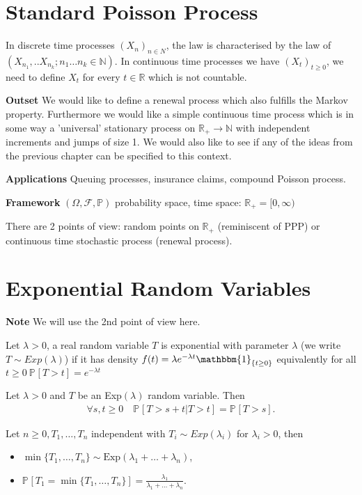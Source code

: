 \section{Standard Poisson Process}
In discrete time processes $(X_n)_{n\in N}$, the law is characterised by the law of $(X_{n_1},..X_{n_k}; n_1 \ldots n_k \in \mathbb{N})$. In continuous time processes we have $(X_t)_{t\geq 0}$, we need to define $X_t$ for every $ t \in \mathbb{R}$ which is not countable.

\noindent \textbf{Outset} We would like to define a renewal process which also fulfills the Markov property. Furthermore we would like a simple continuous time process which is in some way a 'universal' stationary process on $\mathbb{R}_+ \to \mathbb{N}$ with independent increments and jumps of size 1. We would also like to see if any of the ideas from the previous chapter can be specified to this context.

\textbf{Applications} Queuing processes, insurance claims, compound Poisson process.

\textbf{Framework} $(\Omega, \mathcal{F}, \mathbb{P})$ probability space, time space: $\mathbb{R}_{+}=[0,\infty)$ 

There are 2 points of view: random points on $\mathbb{R}_{+}$ (reminiscent of PPP) or continuous time stochastic process (renewal process).

\section{Exponential Random Variables}
\textbf{Note} We will use the 2nd point of view here.

\begin{defn}
	Let $\lambda> 0$, a real random variable $T$ is exponential with parameter $\lambda$ (we write $T \sim Exp(\lambda)$) if it has density $f(t) = \lambda e ^{-\lambda t} \mathbbm{1}_{\{t\geq 0\}}$ equivalently for all $t\geq 0\ \mathbb{P}_{} \left[ T>t \right] = e^{-\lambda t}$
\end{defn}

\begin{prop}
	Let $\lambda > 0$ and $T$ be an Exp$(\lambda)$ random variable. Then  
	\begin{align}
		\boxed{\forall s,t\geq 0\quad \mathbb{P}_{} \left[ T>s+t | T>t \right] = \mathbb{P}_{} \left[ T>s \right]. }
	\end{align}
\end{prop}
\begin{prop}
	Let $n\geq 0, T_1, \ldots ,T_n$ independent with $T_i \sim Exp(\lambda_i)$ for $ \lambda_i > 0$, then 
\begin{itemize}
	\item $\min\{T_1, \ldots, T_n\} \sim \textrm{Exp}(\lambda_1+ \ldots +\lambda_n)$,
	\item $\mathbb{P}_{} \left[ T_1 = \min\{T_1, \ldots ,T_n\} \right] = \frac{\lambda_1}{\lambda_1+ \ldots +\lambda_n}$.
\end{itemize}

\end{prop}
 
